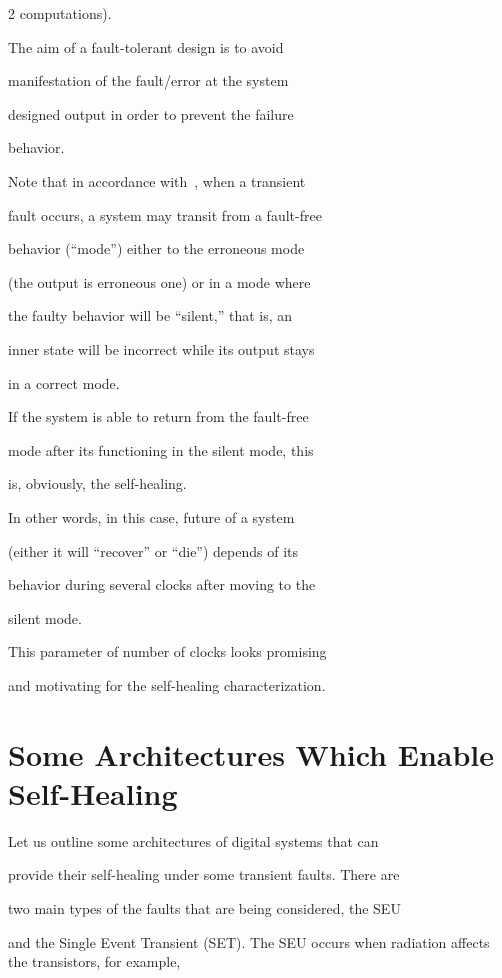 \begin{multicols}{2}
computations).



The aim of a fault-tolerant design is to avoid

manifestation of the fault/error at the system

designed output in order to prevent the failure

behavior.

Note that in accordance with~\cite{6fr}, when a transient

fault occurs, a system may transit from a fault-free

behavior (``mode'') either to the erroneous mode

(the output is erroneous one) or in a mode where

the faulty behavior will be ``silent,'' that is, an

inner state will be incorrect while its output stays

in a correct mode.

If the system is able to return from the fault-free

mode after its functioning in the silent mode, this

is, obviously, the self-healing.

In other words, in this case, future of a system

(either it will ``recover'' or ``die'') depends of its

behavior during several clocks after moving to the

silent mode.

This parameter of number of clocks looks promising

and motivating for the self-healing characterization.




\section{Some Architectures Which Enable Self-Healing}



\noindent

Let us outline some architectures of digital systems that can

provide their self-healing under some transient faults. There are

two main types of the faults that are being considered, the SEU

and the Single Event Transient (SET). The SEU occurs when radiation affects the transistors, for example,


\end{multicols}
